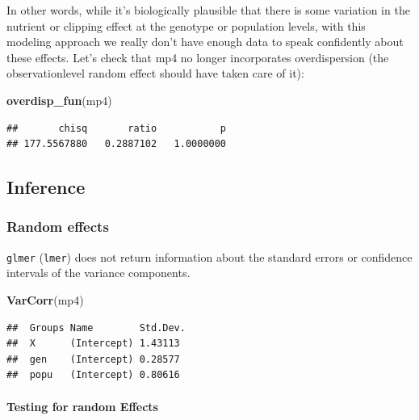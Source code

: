 \documentclass[
  12pt,
]{book}
\newenvironment{Shaded}{\begin{snugshade}}{\end{snugshade}}
\newcommand{\KeywordTok}[1]{\textcolor[rgb]{0.13,0.29,0.53}{\textbf{#1}}}
\newcommand{\NormalTok}[1]{#1}
\begin{document}
In other words, while it's biologically plausible that there is some variation in the nutrient or clipping effect at the genotype or population levels, with this modeling approach we really don't have enough data to speak confidently about these effects.
Let's check that mp4 no longer incorporates overdispersion (the observationlevel random effect should have taken care of it):

\begin{Shaded}
\begin{Highlighting}[]
\KeywordTok{overdisp\_fun}\NormalTok{(mp4)}
\end{Highlighting}
\end{Shaded}

\begin{verbatim}
##       chisq       ratio           p 
## 177.5567880   0.2887102   1.0000000
\end{verbatim}

\hypertarget{inference}{%
\subsection{Inference}\label{inference}}

\hypertarget{random-effects}{%
\subsubsection{Random effects}\label{random-effects}}

\texttt{glmer} (\texttt{lmer}) does not return information about the standard errors or confidence intervals of the variance components.

\begin{Shaded}
\begin{Highlighting}[]
\KeywordTok{VarCorr}\NormalTok{(mp4)}
\end{Highlighting}
\end{Shaded}

\begin{verbatim}
##  Groups Name        Std.Dev.
##  X      (Intercept) 1.43113 
##  gen    (Intercept) 0.28577 
##  popu   (Intercept) 0.80616
\end{verbatim}

\hypertarget{testing-for-random-effects-1}{%
\paragraph{Testing for random Effects}\label{testing-for-random-effects-1}}
\end{document}
